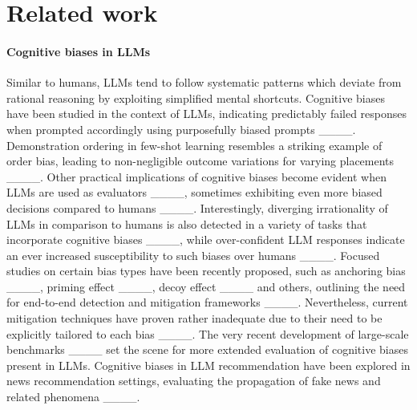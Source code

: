 \section{Related work}
\label{sec:related}
\paragraph{Cognitive biases in LLMs} Similar to humans, LLMs tend to follow systematic patterns which deviate from rational reasoning by exploiting simplified mental shortcuts. Cognitive biases have been studied in the context of LLMs, indicating predictably failed responses when prompted accordingly using purposefully biased prompts ____. Demonstration ordering in few-shot learning resembles a striking example of order bias, leading to non-negligible outcome variations for varying placements ____.
Other practical implications of cognitive biases become evident when LLMs are used as evaluators ____, sometimes exhibiting even more biased decisions compared to humans ____. Interestingly, diverging irrationality of LLMs in comparison to humans is also detected in a variety of tasks that incorporate cognitive biases ____, while over-confident LLM responses indicate an ever increased susceptibility to such biases over humans ____.
Focused studies on certain bias types have been recently proposed, such as anchoring bias ____, priming effect ____, decoy effect ____ and others, outlining the need for end-to-end detection and mitigation frameworks ____. Nevertheless, current mitigation techniques have proven rather inadequate due to their need to be explicitly tailored to each bias ____. The very recent development of large-scale benchmarks ____ set the scene for more extended evaluation of cognitive biases present in LLMs. 
Cognitive biases in LLM recommendation have been explored in news recommendation settings, evaluating the propagation of fake news and related phenomena ____.

 

